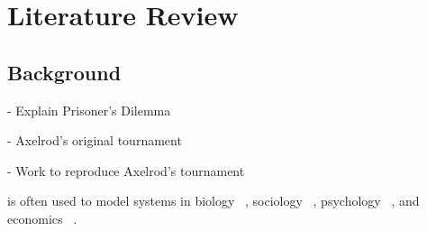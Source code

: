 \chapter{Literature Review}\label{cha:literature_review}

\section{Background}

- Explain Prisoner's Dilemma

- Axelrod's original tournament

- Work to reproduce Axelrod's tournament ~\cite{Knight2016}



is often used to model systems in biology ~\cite{Sigmund1999}, sociology ~\cite{Franken2005},
psychology ~\cite{Ishibuchi2005}, and economics ~\cite{Chong2005}.


